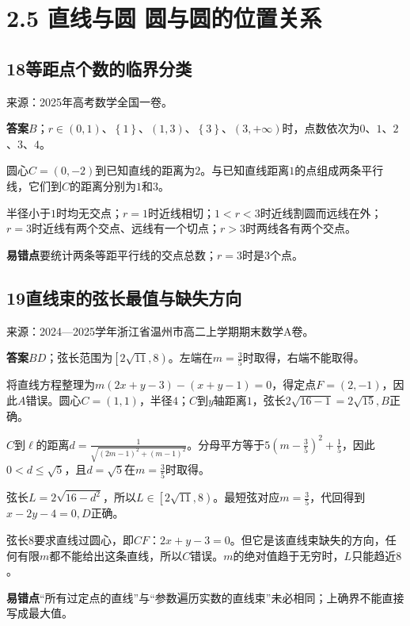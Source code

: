 \documentclass[UTF8,11pt,a4paper,fontset=windows]{ctexart}
\newcommand{\qhead}[2]{\subsection{#1\texorpdfstring{\quad}{ }#2}}
\newcommand{\qsource}[1]{{\footnotesize 来源：#1。\par}}
\begin{document}
\section{2.5 直线与圆 圆与圆的位置关系}


\qhead{18}{等距点个数的临界分类}
\qsource{2025年高考数学全国一卷}
\textbf{答案}\quad \(B\)；\(r\in \left(0,\allowbreak 1\right)\)、\(\left\{1\right\}\)、\(\left(1,\allowbreak 3\right)\)、\(\left\{3\right\}\)、\(\left(3,\allowbreak + \infty \right)\)时，点数依次为\(0\)、\(1\)、\(2\)、\(3\)、\(4\)。\par
圆心\(C= \left(0,\allowbreak - 2\right)\)到已知直线的距离为\(2\)。与已知直线距离\(1\)的点组成两条平行线，它们到\(C\)的距离分别为\(1\)和\(3\)。\par
半径小于\(1\)时均无交点；\(r= 1\)时近线相切；\(1< r< 3\)时近线割圆而远线在外；\(r= 3\)时近线有两个交点、远线有一个切点；\(r> 3\)时两线各有两个交点。\par
{\small\textbf{易错点}\quad 要统计两条等距平行线的交点总数；\(r= 3\)时是\(3\)个点。\par}

\qhead{19}{直线束的弦长最值与缺失方向}
\qsource{2024—2025学年浙江省温州市高二上学期期末数学A卷}
\textbf{答案}\quad \(BD\)；弦长范围为\(\left[2\sqrt{11},\allowbreak 8\right)\)。左端在\(m= \frac{3}{5}\)时取得，右端不能取得。\par
将直线方程整理为\(m\left(2x+ y- 3\right)- \left(x+ y- 1\right)= 0\)，得定点\(F= \left(2,\allowbreak - 1\right)\)，因此\(A\)错误。圆心\(C= \left(1,\allowbreak 1\right)\)，半径\(4\)；\(C\)到\(y\)轴距离\(1\)，弦长\(2\sqrt{16- 1}= 2\sqrt{15},\allowbreak B\)正确。\par
\(C\)到\(\ell \)的距离\(d= \frac{1}{\sqrt{\left(2m- 1\right)^{2}+ \left(m- 1\right)^{2}}}\)。分母平方等于\(5\left(m- \frac{3}{5}\right)^{2}+ \frac{1}{5}\)，因此\(0< d\le \sqrt{5}\)，且\(d= \sqrt{5}\)在\(m= \frac{3}{5}\)时取得。\par
弦长\(L= 2\sqrt{16- d^{2}}\)，所以\(L\in \left[2\sqrt{11},\allowbreak 8\right)\)。最短弦对应\(m= \frac{3}{5}\)，代回得到\(x- 2y- 4= 0,\allowbreak D\)正确。\par
弦长\(8\)要求直线过圆心，即\(CF\)：\(2x+ y- 3= 0\)。但它是该直线束缺失的方向，任何有限\(m\)都不能给出这条直线，所以\(C\)错误。\(m\)的绝对值趋于无穷时，\(L\)只能趋近\(8\)。\par
{\small\textbf{易错点}\quad “所有过定点的直线”与“参数遍历实数的直线束”未必相同；上确界不能直接写成最大值。\par}

\clearpage
\end{document}
